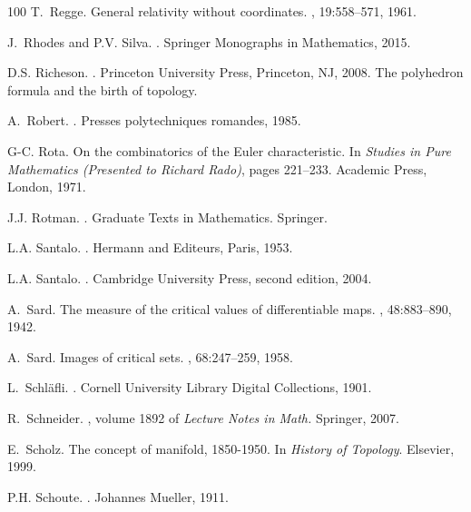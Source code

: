 \documentclass[12pt]{amsart}
\begin{document}
\begin{thebibliography}{100}
T.~Regge.
\newblock General relativity without coordinates.
, 19:558--571, 1961.

J.~Rhodes and P.V. Silva.
.
\newblock Springer Monographs in Mathematics, 2015.

D.S. Richeson.
.
\newblock Princeton University Press, Princeton, NJ, 2008.
\newblock The polyhedron formula and the birth of topology.

A.~Robert.
.
\newblock Presses polytechniques romandes, 1985.

G-C. Rota.
\newblock On the combinatorics of the {E}uler characteristic.
\newblock In {\em Studies in {P}ure {M}athematics ({P}resented to {R}ichard
  {R}ado)}, pages 221--233. Academic Press, London, 1971.

J.J. Rotman.
.
\newblock Graduate Texts in Mathematics. Springer.

L.A. Santalo.
.
\newblock Hermann and Editeurs, Paris, 1953.

L.A. Santalo.
.
\newblock Cambridge University Press, second edition, 2004.

A.~Sard.
\newblock The measure of the critical values of differentiable maps.
, 48:883--890, 1942.

A.~Sard.
\newblock Images of critical sets.
, 68:247--259, 1958.

L.~Schl{\"a}fli.
.
\newblock Cornell University Library Digital Collections, 1901.

R.~Schneider.
, volume 1892
  of {\em Lecture Notes in Math.}
\newblock Springer, 2007.

E.~Scholz.
\newblock The concept of manifold, 1850-1950.
\newblock In {\em History of Topology}. Elsevier, 1999.

P.H. Schoute.
.
\newblock Johannes Mueller, 1911.


\end{thebibliography}
\end{document}
